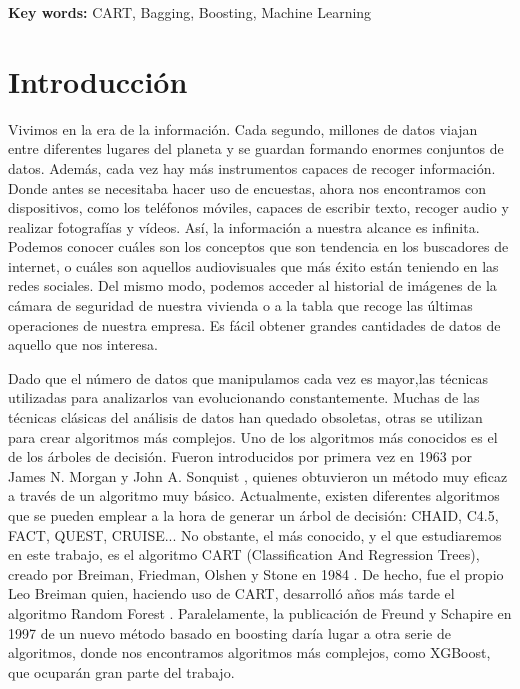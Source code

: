 \documentclass[12pt,twoside]{article}
\begin{document}
\textbf{Key words:} CART, Bagging, Boosting, Machine Learning



\newpage



\tableofcontents



\newpage



\section{Introducción}

Vivimos en la era de la información. Cada segundo, millones de datos viajan entre diferentes lugares del planeta y se guardan formando enormes conjuntos de datos. Además, cada vez hay más instrumentos capaces de recoger información. Donde antes se necesitaba hacer uso de encuestas, ahora nos encontramos con dispositivos, como los teléfonos móviles, capaces de escribir texto, recoger audio y realizar fotografías y vídeos. Así, la información a nuestra alcance es infinita. Podemos conocer cuáles son los conceptos que son tendencia en los buscadores de internet, o cuáles son aquellos audiovisuales que más éxito están teniendo en las redes sociales. Del mismo modo, podemos acceder al historial de imágenes de la cámara de seguridad de nuestra vivienda o a la tabla que recoge las últimas operaciones de nuestra empresa. Es fácil obtener grandes cantidades de datos de aquello que nos interesa.

Dado que el número de datos que manipulamos cada vez es mayor,las técnicas utilizadas para analizarlos van evolucionando constantemente. Muchas de las técnicas clásicas del análisis de datos han quedado obsoletas, otras se utilizan para crear algoritmos más complejos. Uno de los algoritmos más conocidos es el de los árboles de decisión. Fueron introducidos por primera vez en 1963 por James N. Morgan y John A. Sonquist \cite{MO01}, quienes obtuvieron un método muy eficaz a través de un algoritmo muy básico. Actualmente, existen diferentes algoritmos que se pueden emplear a la hora de generar un árbol de decisión: CHAID, C4.5, FACT, QUEST, CRUISE... No obstante, el más conocido, y el que estudiaremos en este trabajo, es el algoritmo CART (Classification And Regression Trees), creado por Breiman, Friedman, Olshen y Stone en 1984 \cite{BR02}. De hecho, fue el propio Leo Breiman quien, haciendo uso de CART, desarrolló años más tarde el algoritmo Random Forest \cite{BR01}. Paralelamente, la publicación de Freund y Schapire en 1997 \cite{FR01} de un nuevo método basado en boosting daría lugar a otra serie de algoritmos, donde nos encontramos algoritmos más complejos, como XGBoost, que ocuparán gran parte del trabajo.
\end{document}
